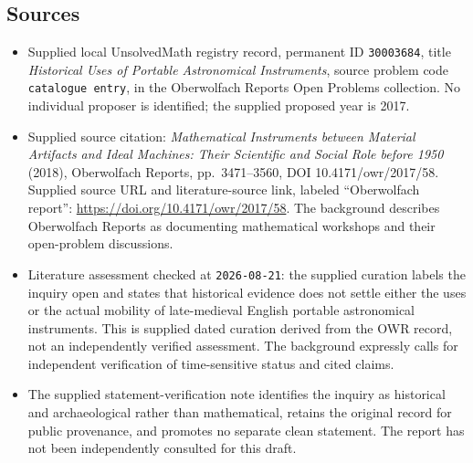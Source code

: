 \documentclass[11pt]{article}
\begin{document}
\subsection{Sources}
\begin{itemize}
\item Supplied local UnsolvedMath registry record, permanent ID \texttt{30003684}, title \emph{Historical Uses of Portable Astronomical Instruments}, source problem code \texttt{catalogue entry}, in the Oberwolfach Reports Open Problems collection. No individual proposer is identified; the supplied proposed year is 2017.
\item Supplied source citation: \emph{Mathematical Instruments between Material Artifacts and Ideal Machines: Their Scientific and Social Role before 1950} (2018), Oberwolfach Reports, pp.\ 3471--3560, DOI 10.4171/owr/2017/58. Supplied source URL and literature-source link, labeled ``Oberwolfach report'': \url{https://doi.org/10.4171/owr/2017/58}. The background describes Oberwolfach Reports as documenting mathematical workshops and their open-problem discussions.
\item Literature assessment checked at \texttt{2026-08-21}: the supplied curation labels the inquiry open and states that historical evidence does not settle either the uses or the actual mobility of late-medieval English portable astronomical instruments. This is supplied dated curation derived from the OWR record, not an independently verified assessment. The background expressly calls for independent verification of time-sensitive status and cited claims.
\item The supplied statement-verification note identifies the inquiry as historical and archaeological rather than mathematical, retains the original record for public provenance, and promotes no separate clean statement. The report has not been independently consulted for this draft.
\end{itemize}
\end{document}
